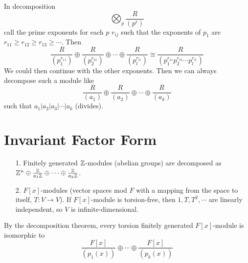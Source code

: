 \documentclass[a4paper,twoside,master.tex]{subfiles}
\begin{document}
In decomposition
\begin{equation}
    \bigotimes_p \frac{R}{(p^r)}
\end{equation}
call the prime exponents for each $ p $ $ r_{ij} $ such that the exponents of $ p_1 $ are $ r_{11} \geq r_{12} \geq r_{13} \geq \cdots $. Then
\begin{equation}
    \frac{R}{(p_1^{r_{11}})} \oplus \frac{R}{(p_2^{r_{21}})} \oplus \cdots \oplus \frac{R}{(p_l^{r_{l1}})} \cong \frac{R}{(p_1^{r_{11}} p_2^{r_{21}} \cdots p_l^{r_{l1}})}
\end{equation}
We could then continue with the other exponents. Then we can always decompose such a module like
\begin{equation}
    \frac{R}{(a_1)} \oplus \frac{R}{(a_2)} \oplus \cdots \oplus \frac{R}{(a_k)}
\end{equation}
such that $ a_1 | a_2 | a_3 | \cdots | a_k $ (divides).

\section{Invariant Factor Form}\label{sec:invariant_factor_form}

\begin{itemize}
    \item[1.] Finitely generated $ \mathbb{Z} $-modules (abelian groups) are decomposed as $ \mathbb{Z}^n \oplus \frac{\mathbb{Z}}{a_1 \mathbb{Z}} \oplus \cdots \oplus \frac{\mathbb{Z}}{a_k \mathbb{Z}} $.
    \item[2.] $ F[x] $-modules (vector spaces mod $ F $ with a mapping from the space to itself, $ T\colon V \to V $). If $ F[x] $-module is torsion-free, then $ 1, T, T^2, \cdots $ are linearly independent, so $ V $ is infinite-dimensional.
\end{itemize}

By the decomposition theorem, every torsion finitely generated $ F[x] $-module is isomorphic to
\begin{equation}
    \frac{F[x]}{(p_1(x))} \oplus \cdots \oplus \frac{F[x]}{(p_k(x))}
\end{equation}
\end{document}
